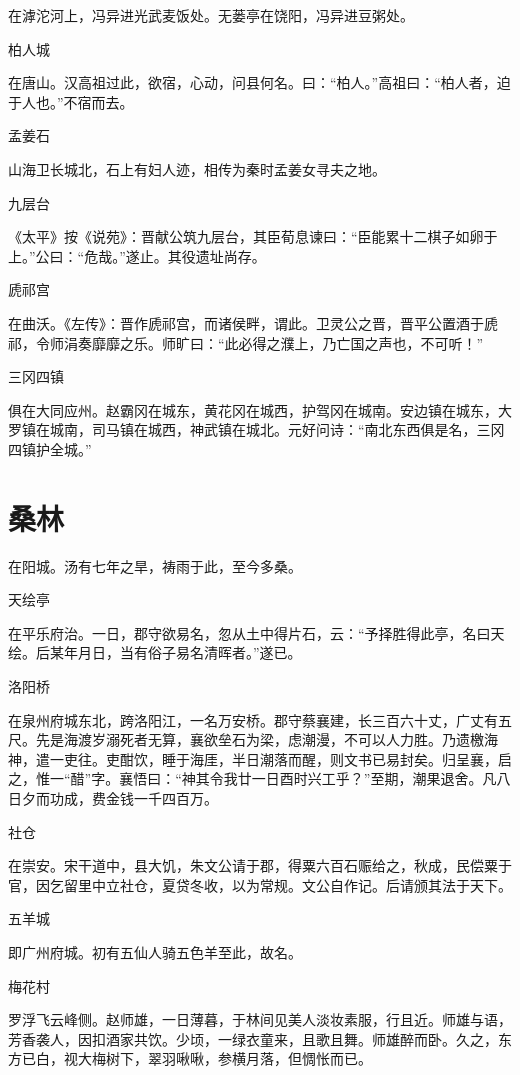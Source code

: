 \documentclass[a4paper,12pt,UTF8,twoside]{ctexbook}
\begin{document}
	在滹沱河上，冯异进光武麦饭处。无蒌亭在饶阳，冯异进豆粥处。
	
	柏人城
	
	在唐山。汉高祖过此，欲宿，心动，问县何名。曰：“柏人。”高祖曰：“柏人者，迫于人也。”不宿而去。
	
	孟姜石
	
	山海卫长城北，石上有妇人迹，相传为秦时孟姜女寻夫之地。
	
	九层台
	
	《太平》按《说苑》：晋献公筑九层台，其臣荀息谏曰：“臣能累十二棋子如卵于上。”公曰：“危哉。”遂止。其役遗址尚存。
	
	虒祁宫
	
	在曲沃。《左传》：晋作虒祁宫，而诸侯畔，谓此。卫灵公之晋，晋平公置酒于虒祁，令师涓奏靡靡之乐。师旷曰：“此必得之濮上，乃亡国之声也，不可听！”
	
	三冈四镇
	
	俱在大同应州。赵霸冈在城东，黄花冈在城西，护驾冈在城南。安边镇在城东，大罗镇在城南，司马镇在城西，神武镇在城北。元好问诗：“南北东西俱是名，三冈四镇护全城。”
	
	\section{桑林}
	
	在阳城。汤有七年之旱，祷雨于此，至今多桑。
	
	天绘亭
	
	在平乐府治。一日，郡守欲易名，忽从土中得片石，云：“予择胜得此亭，名曰天绘。后某年月日，当有俗子易名清晖者。”遂已。
	
	洛阳桥
	
	在泉州府城东北，跨洛阳江，一名万安桥。郡守蔡襄建，长三百六十丈，广丈有五尺。先是海渡岁溺死者无算，襄欲垒石为梁，虑潮漫，不可以人力胜。乃遗檄海神，遣一吏往。吏酣饮，睡于海厓，半日潮落而醒，则文书已易封矣。归呈襄，启之，惟一“醋”字。襄悟曰：“神其令我廿一日酉时兴工乎？”至期，潮果退舍。凡八日夕而功成，费金钱一千四百万。
	
	社仓
	
	在崇安。宋干道中，县大饥，朱文公请于郡，得粟六百石赈给之，秋成，民偿粟于官，因乞留里中立社仓，夏贷冬收，以为常规。文公自作记。后请颁其法于天下。
	
	五羊城
	
	即广州府城。初有五仙人骑五色羊至此，故名。
	
	梅花村
	
	罗浮飞云峰侧。赵师雄，一日薄暮，于林间见美人淡妆素服，行且近。师雄与语，芳香袭人，因扣酒家共饮。少顷，一绿衣童来，且歌且舞。师雄醉而卧。久之，东方已白，视大梅树下，翠羽啾啾，参横月落，但惆怅而已。
	
\end{document}
